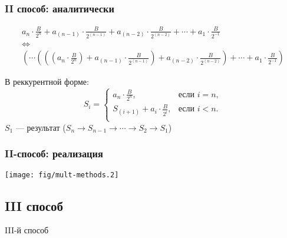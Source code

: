 \begin{frame}
    \frametitle{II способ: аналитически}

    \begin{gather*}
        a_{n}\cdot\frac{B}{2^{n}}
            +a_{(n-1)}\cdot\frac{B}{2^{(n-1)}}
                +a_{(n-2)}\cdot\frac{B}{2^{(n-2)}}
                    + \cdots 
                        +a_{1}\cdot\frac{B}{2^{-1}}
        \\
        \Leftrightarrow
        \\
        \left(\cdots\left(\left(\left(a_{n}\cdot\frac{B}{2^{n}}\right)
            +a_{(n-1)}\cdot\frac{B}{2^{(n-1)}}\right)
                +a_{(n-2)}\cdot\frac{B}{2^{(n-2)}}\right)
                    + \cdots 
                        +a_{1}\cdot\frac{B}{2^{-1}}\right)
    \end{gather*}
    
    В реккурентной форме:
    \[
        S_i=
        \begin{cases}
            \displaystyle a_{n}\cdot\frac{B}{2^{n}},            &\text{если $i=n$},\\
            \displaystyle S_{(i+1)} + a_i\cdot\frac{B}{2^{i}}, &\text{если $i<n$}.\\
        \end{cases}
    \]
    $S_1$ --- результат ($S_n\to S_{n-1}\to\cdots\to S_2\to S_1$)
\end{frame}

\begin{frame}
    \frametitle{II-способ: реализация}
    
    \begin{center}
        \texttt{[image: fig/mult-methods.2]}
    \end{center}
\end{frame}


\subsection{III способ}

\begin{frame}
    \begin{center}
        III-й способ
    \end{center}
\end{frame}

